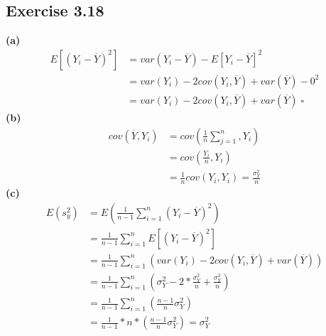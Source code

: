 \documentclass[fleqn]{article}
\begin{document}
\begin{adjustwidth}{-2cm}{-2cm}
\subsection{Exercise 3.18}
\textbf{(a)}
\begin{align*}
E\left[\left(Y_{i} - \overline{Y}\right)^{2}\right] &= var\left(Y_{i} - \overline{Y}\right) - E\left[Y_{i} - \overline{Y}\right]^{2}\\
&= var\left(Y_{i}\right) - 2cov\left(Y_{i}, \overline{Y}\right) + var\left(\overline{Y}\right) - 0^{2} \\
&= var\left(Y_{i}\right) - 2cov\left(Y_{i}, \overline{Y}\right) + var\left(\overline{Y}\right) \; \square
\end{align*}
\textbf{(b)}
\begin{align*}
cov\left(\overline{Y}, Y_{i}\right) &= cov\left(\frac{1}{n}\sum_{j=1}^{n}, Y_{i}\right)\\
&= cov\left(\frac{Y_{i}}{n}, Y_{i}\right)\\
&= \frac{1}{n}cov\left(Y_{i}, Y_{i}\right) = \frac{\sigma_{Y}^{2}}{n}
\end{align*}
\textbf{(c)}
\begin{align*}
E\left(s_{y}^{2}\right) &= E\left(\frac{1}{n-1}\sum_{i=1}^{n}\left(Y_{i} - \overline{Y}\right)^{2}\right)\\
&= \frac{1}{n-1}\sum_{i=1}^{n}E\left[\left(Y_{i} - \overline{Y}\right)^{2}\right]\\
&= \frac{1}{n-1}\sum_{i=1}^{n}\left(var\left(Y_{i}\right) - 2cov\left(Y_{i}, \overline{Y}\right) + var\left(\overline{Y}\right)\right)\\
&= \frac{1}{n-1}\sum_{i=1}^{n}\left(\sigma_{Y}^{2} - 2*\frac{\sigma_{Y}^{2}}{n} + \frac{\sigma_{Y}^{2}}{n}\right)\\
&= \frac{1}{n-1}\sum_{i=1}^{n}\left(\frac{n-1}{n}\sigma_{Y}^{2}\right)\\
&= \frac{1}{n-1}*n*\left(\frac{n-1}{n}\sigma_{Y}^{2}\right) = \sigma_{Y}^{2}
\end{align*}


\end{adjustwidth}
\end{document}
